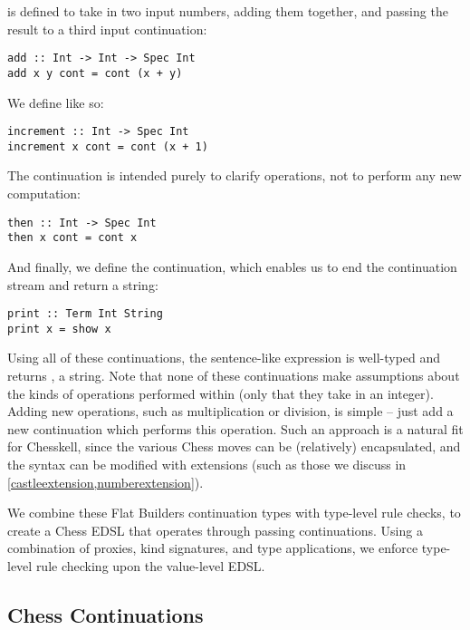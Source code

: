  is defined to take in two input numbers, adding them together, and passing the result to a third input continuation:

\begin{lstlisting}
add :: Int -> Int -> Spec Int
add x y cont = cont (x + y)
\end{lstlisting}

We define  like so:

\begin{lstlisting}
increment :: Int -> Spec Int
increment x cont = cont (x + 1)
\end{lstlisting}

The continuation  is intended purely to clarify operations, not to perform any new computation:

\begin{lstlisting}
then :: Int -> Spec Int
then x cont = cont x
\end{lstlisting}

And finally, we define the  continuation, which enables us to end the continuation stream and return a string:

\begin{lstlisting}
print :: Term Int String
print x = show x
\end{lstlisting}

Using all of these continuations, the sentence-like expression  is well-typed and returns , a string. Note that none of these continuations make assumptions about the kinds of operations performed within (only that they take in an integer). Adding new operations, such as multiplication or division, is simple -- just add a new continuation which performs this operation. Such an approach is a natural fit for Chesskell, since the various Chess moves can be (relatively) encapsulated, and the syntax can be modified with extensions (such as those we discuss in \cref{castleextension,numberextension}).

We combine these Flat Builders continuation types with type-level rule checks, to create a Chess EDSL that operates through passing continuations. Using a combination of proxies, kind signatures, and type applications, we enforce type-level rule checking upon the value-level EDSL.

\subsection{Chess Continuations}

